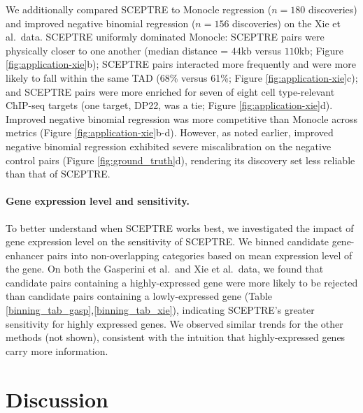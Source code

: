 \documentclass{article}
\begin{document}
We additionally compared SCEPTRE to Monocle regression ($n = 180$ discoveries) and improved negative binomial regression ($n = 156$ discoveries) on the Xie et al.\ data. SCEPTRE uniformly dominated Monocle: SCEPTRE pairs were physically closer to one another (median distance = $44$kb versus $110$kb; Figure \ref{fig:application-xie}b); SCEPTRE pairs interacted more frequently and were more likely to fall within the same TAD (68\% versus 61\%; Figure \ref{fig:application-xie}c); and SCEPTRE pairs were more enriched for seven of eight cell type-relevant ChIP-seq targets (one target, DP22, was a tie; Figure \ref{fig:application-xie}d). Improved negative binomial regression was more competitive than Monocle across metrics (Figure \ref{fig:application-xie}b-d). However, as noted earlier, improved negative binomial regression exhibited severe miscalibration on the negative control pairs (Figure \ref{fig:ground_truth}d), rendering its discovery set less reliable than that of SCEPTRE.

\paragraph{Gene expression level and sensitivity.}
To better understand when SCEPTRE works best, we investigated the impact of gene expression level on the sensitivity of SCEPTRE. We binned candidate gene-enhancer pairs into non-overlapping categories based on mean expression level of the gene. On both the Gasperini et al.\ and Xie et al.\ data, we found that candidate pairs containing a highly-expressed gene were more likely to be rejected than candidate pairs containing a lowly-expressed gene (Table \ref{binning_tab_gasp},\ref{binning_tab_xie}), indicating SCEPTRE's greater sensitivity for highly expressed genes. We observed similar trends for the other methods (not shown), consistent with the intuition that highly-expressed genes carry more information.

\section*{Discussion}
\end{document}
